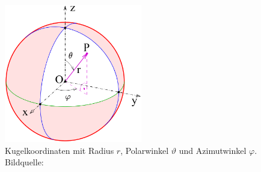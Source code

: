 \begin{figure}
	\centering
	\includegraphics[width=6cm]{papers/geodaeten/Abbildungen/Linienelemente/LinKugel1}
	\caption{Kugelkoordinaten mit Radius $r$, Polarwinkel $\vartheta$ und Azimutwinkel $\varphi$. Bildquelle: \cite{geodaeten:Kugelkoordinaten}}
	\label{geodaeten:figure:Linienelemente:Kugelkoordinaten:Kugelkoordinaten}
\end{figure}
